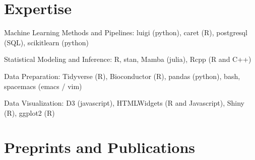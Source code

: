 \documentclass[letterpaper]{article}
\renewenvironment{itemize}{
  \begin{list}{}{
    \setlength{\leftmargin}{1.5em}
  }
}{
  \end{list}
}
\begin{document}
\section*{Expertise}
\begin{itemize}
\item Machine Learning Methods and Pipelines: luigi (python), caret (R),
  postgresql (SQL), scikitlearn (python)
\item Statistical Modeling and Inference: R, stan, Mamba (julia), Rcpp (R and C++)
\item Data Preparation: Tidyverse (R), Bioconductor (R), pandas (python), bash,
  spacemacs (emacs / vim)
\item Data Visualization: D3 (javascript), HTMLWidgets (R and Javascript), Shiny
  (R), ggplot2 (R)
\end{itemize}
\section*{Preprints and Publications}
\end{document}
